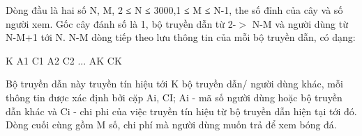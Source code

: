 Dòng đầu là hai số N, M, 2 ≤ N ≤ 3000,1 ≤ M ≤ N-1, the số đỉnh của cây  và số người xem. Gốc cây đánh số là 1, bộ truyền dẫn từ 2-$>$ N-M và người dùng từ N-M+1 tới N.  N-M dòng tiếp theo lưu thông tin của mỗi bộ truyền dẫn, có dạng:  

   K A1 C1 A2 C2 ... AK CK  

   Bộ truyền dẫn này truyền tín hiệu tới K bộ truyền dẫn/ người dùng khác,  mỗi thông tin được xác định bởi cặp Ai, CI; Ai - mã số người dùng hoặc  bộ truyền dẫn khác và Ci - chi phi của việc truyền tín hiệu từ bộ truyền  dẫn hiện tại tới đó. Dòng cuối cùng gồm M số, chi phí mà người dùng muốn trả để xem bóng đá.  

\